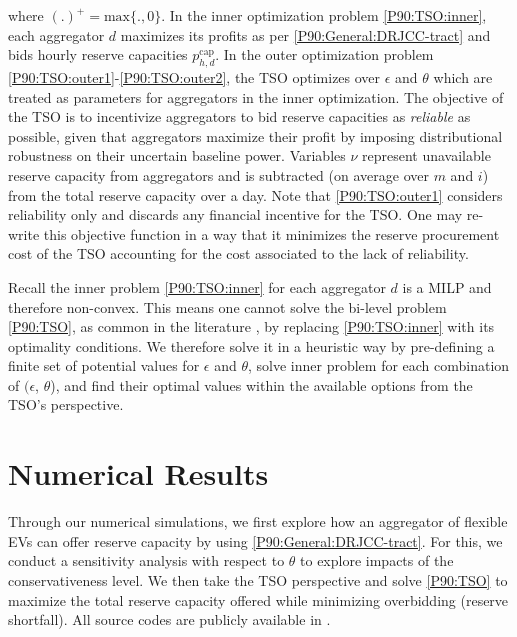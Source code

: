 \documentclass[conference]{IEEEtran}
\begin{document}
where $(.)^{+}\!=\!\text{max} \{.,0\}.$
In the inner optimization problem \eqref{P90:TSO:inner}, each aggregator $d$ maximizes its profits as per \eqref{P90:General:DRJCC-tract} and bids hourly reserve capacities $p_{h,d}^{\text{cap}}$. In the outer optimization problem \eqref{P90:TSO:outer1}-\eqref{P90:TSO:outer2}, the \ac{TSO} optimizes over $\epsilon$ and $\theta$ which are treated as parameters for aggregators in the inner optimization. The objective of the \ac{TSO} is to incentivize aggregators to bid reserve capacities as \textit{reliable} as possible, given that aggregators maximize their profit by imposing distributional robustness on their uncertain baseline power. Variables $\nu$ represent unavailable reserve capacity from aggregators and is subtracted (on average over $m$ and $i$) from the total reserve capacity over a day. Note that  \eqref{P90:TSO:outer1} considers reliability only and discards any financial incentive for the TSO. One may re-write this objective function in a way that it minimizes the reserve procurement cost of the TSO accounting for the cost associated to the lack of reliability. 

Recall the inner problem \eqref{P90:TSO:inner} for each aggregator $d$ is a MILP and therefore non-convex. This means one cannot solve the bi-level problem \eqref{P90:TSO}, as common in the literature \cite{pozo}, by replacing \eqref{P90:TSO:inner} with its optimality conditions. We therefore solve it in a heuristic way by pre-defining a finite set of potential values for $\epsilon$ and $\theta$, solve inner problem for each combination of $(\epsilon$, $\theta$), and find their optimal values within the available  options from the TSO's perspective. 

\vspace{2mm}
\section{Numerical Results}
\vspace{-1mm}
Through our numerical simulations, we first explore 
how an aggregator of flexible \acp{EV} can offer reserve capacity by using \eqref{P90:General:DRJCC-tract}. For this, we conduct a sensitivity analysis with respect to $\theta$ to explore impacts of the conservativeness level. We then take the \ac{TSO} perspective and solve \eqref{P90:TSO} to  maximize the total reserve capacity offered while minimizing overbidding (reserve shortfall). All source codes are publicly available in \cite{code}.
\end{document}
